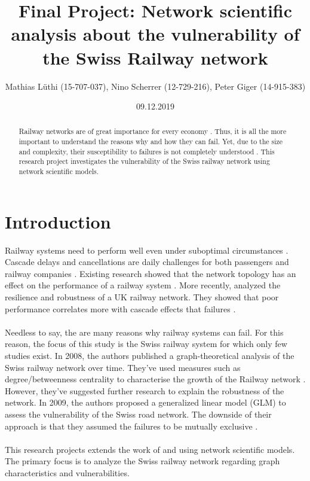 \documentclass{Resources/netsci-project}
\begin{document}

\title{Final Project: Network scientific analysis about the vulnerability of the Swiss Railway network}
\author{Mathias Lüthi (15-707-037), Nino Scherrer (12-729-216), Peter Giger (14-915-383)}
\date{09.12.2019}

\maketitle

\begin{abstract}
Railway networks are of great importance for every economy \autocite{Resilience}. Thus, it is all the more important to understand the reasons why and how they can fail. Yet, due to the size and complexity, their susceptibility to failures is not completely understood \autocite{Resilience}. This research project investigates the vulnerability of the Swiss railway network using network scientific models.
\end{abstract}


\section{Introduction}
Railway systems need to perform well even under suboptimal circumstances \autocite{Resilience}. Cascade delays and cancellations are daily challenges for both passengers and railway companies \autocite{Resilience}. Existing research showed that the network topology has an effect on the performance of a railway system \autocite{ComplexTopology}. More recently, \textcite{Resilience} analyzed the resilience and robustness of a UK railway network. They showed that poor performance correlates more with cascade effects that failures \autocite{Resilience}.
\\~\\
Needless to say, the are many reasons why railway systems can fail. For this reason, the focus of this study is the Swiss railway system for which only few studies exist. In 2008, the authors \textcite{GraphSwiss} published a graph-theoretical analysis of the Swiss railway network over time. They've used measures such as degree/betweenness centrality to characterise the growth of the Railway network \autocite{GraphSwiss}. However, they've suggested further research to explain the robustness of the network. In 2009, the authors \textcite{VulnerabilitySwiss} proposed a generalized linear model (GLM) to assess the vulnerability of the Swiss road network. The downside of their approach is that they assumed the failures to be mutually exclusive \autocite{VulnerabilitySwiss}. 
\\~\\
This research projects extends the work of \textcite{GraphSwiss} and \textcite{VulnerabilitySwiss} using network scientific models. The primary focus is to analyze the Swiss railway network regarding graph characteristics and vulnerabilities.
\end{document}
